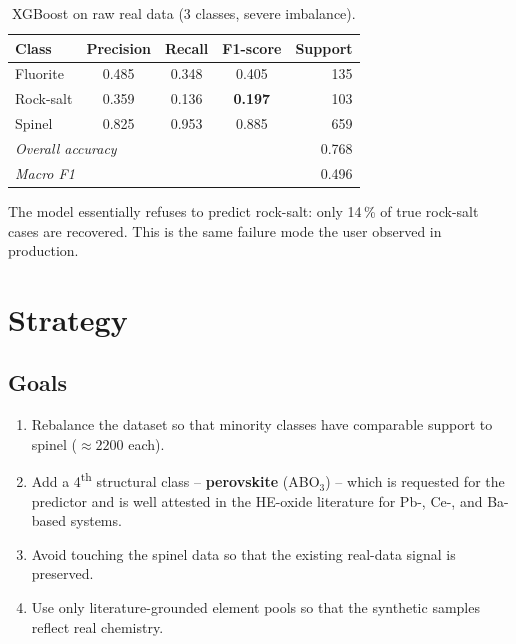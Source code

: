 \documentclass[11pt]{article}
\begin{document}
\begin{table}[h]
\centering
\caption{XGBoost on raw real data (3 classes, severe imbalance).}
\begin{tabular}{lcccr}
\toprule
Class      & Precision & Recall & F1-score & Support \\
\midrule
Fluorite   & 0.485 & 0.348 & 0.405 & 135 \\
Rock-salt  & 0.359 & 0.136 & \textbf{0.197} & 103 \\
Spinel     & 0.825 & 0.953 & 0.885 & 659 \\
\midrule
\multicolumn{4}{l}{\emph{Overall accuracy}} & 0.768 \\
\multicolumn{4}{l}{\emph{Macro F1}}         & 0.496 \\
\bottomrule
\end{tabular}
\end{table}

The model essentially refuses to predict rock-salt: only 14\,\% of true
rock-salt cases are recovered. This is the same failure mode the user
observed in production.

\section{Strategy}
\label{sec:strategy}

\subsection{Goals}
\begin{enumerate}
  \item Rebalance the dataset so that minority classes have comparable support
        to spinel ($\approx 2200$ each).
  \item Add a 4\textsuperscript{th} structural class -- \textbf{perovskite}
        (ABO$_3$) -- which is requested for the predictor and is well attested
        in the HE-oxide literature for Pb-, Ce-, and Ba-based systems.
  \item Avoid touching the spinel data so that the existing real-data signal
        is preserved.
  \item Use only literature-grounded element pools so that the synthetic
        samples reflect real chemistry.
\end{enumerate}
\end{document}
